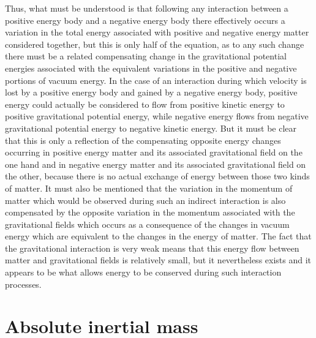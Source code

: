 \documentclass[notitlepage,12pt]{report}
\begin{document}
Thus, what must be understood is that following any interaction between a positive energy body and a negative energy body there effectively occurs a variation in the total energy associated with positive and negative energy matter considered together, but this is only half of the equation, as to any such change there must be a related compensating change in the gravitational potential energies associated with the equivalent variations in the positive and negative portions of vacuum energy. In the case of an interaction during which velocity is lost by a positive energy body and gained by a negative energy body, positive energy could actually be considered to flow from positive kinetic energy to positive gravitational potential energy, while negative energy flows from negative gravitational potential energy to negative kinetic energy. But it must be clear that this is only a reflection of the compensating opposite energy changes occurring in positive energy matter and its associated gravitational field on the one hand and in negative energy matter and its associated gravitational field on the other, because there is no actual exchange of energy between those two kinds of matter. It must also be mentioned that the variation in the momentum of matter which would be observed during such an indirect interaction is also compensated by the opposite variation in the momentum associated with the gravitational fields which occurs as a consequence of the changes in vacuum energy which are equivalent to the changes in the energy of matter. The fact that the gravitational interaction is very weak means that this energy flow between matter and gravitational fields is relatively small, but it nevertheless exists and it appears to be what allows energy to be conserved during such interaction processes.

\section{Absolute inertial mass}
\end{document}
